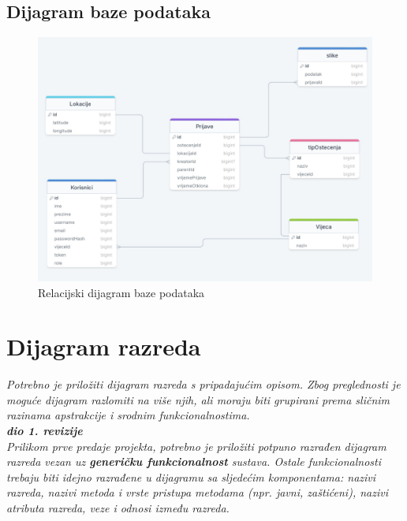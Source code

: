 			\subsection{Dijagram baze podataka}
				\begin{figure}[H]
			\includegraphics[scale=0.3]{slike/bazaPodataka.PNG} %
			\centering
			\caption{Relacijski dijagram baze podataka}
			\label{fig:bazapod}
		\end{figure}
			
			\eject
			
			
		\section{Dijagram razreda}
		
			\textit{Potrebno je priložiti dijagram razreda s pripadajućim opisom. Zbog preglednosti je moguće dijagram razlomiti na više njih, ali moraju biti grupirani prema sličnim razinama apstrakcije i srodnim funkcionalnostima.}\\
			
			\textbf{\textit{dio 1. revizije}}\\
			
			\textit{Prilikom prve predaje projekta, potrebno je priložiti potpuno razrađen dijagram razreda vezan uz \textbf{generičku funkcionalnost} sustava. Ostale funkcionalnosti trebaju biti idejno razrađene u dijagramu sa sljedećim komponentama: nazivi razreda, nazivi metoda i vrste pristupa metodama (npr. javni, zaštićeni), nazivi atributa razreda, veze i odnosi između razreda.}\\
			
